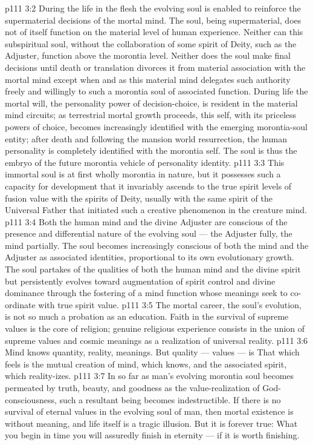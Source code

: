 \vs p111 3:2 During the life in the flesh the evolving soul is enabled to reinforce the supermaterial decisions of the mortal mind. The soul, being supermaterial, does not of itself function on the material level of human experience. Neither can this subspiritual soul, without the collaboration of some spirit of Deity, such as the Adjuster, function above the morontia level. Neither does the soul make final decisions until death or translation divorces it from material association with the mortal mind except when and as this material mind delegates such authority freely and willingly to such a morontia soul of associated function. During life the mortal will, the personality power of decision\hyp{}choice, is resident in the material mind circuits; as terrestrial mortal growth proceeds, this self, with its priceless powers of choice, becomes increasingly identified with the emerging morontia\hyp{}soul entity; after death and following the mansion world resurrection, the human personality is completely identified with the morontia self. The soul is thus the embryo of the future morontia vehicle of personality identity.
\vs p111 3:3 This immortal soul is at first wholly morontia in nature, but it possesses such a capacity for development that it invariably ascends to the true spirit levels of fusion value with the spirits of Deity, usually with the same spirit of the Universal Father that initiated such a creative phenomenon in the creature mind.
\vs p111 3:4 Both the human mind and the divine Adjuster are conscious of the presence and differential nature of the evolving soul --- the Adjuster fully, the mind partially. The soul becomes increasingly conscious of both the mind and the Adjuster as associated identities, proportional to its own evolutionary growth. The soul partakes of the qualities of both the human mind and the divine spirit but persistently evolves toward augmentation of spirit control and divine dominance through the fostering of a mind function whose meanings seek to co\hyp{}ordinate with true spirit value.
\vs p111 3:5 The mortal career, the soul’s evolution, is not so much a probation as an education. Faith in the survival of supreme values is the core of religion; genuine religious experience consists in the union of supreme values and cosmic meanings as a realization of universal reality.
\vs p111 3:6 Mind knows quantity, reality, meanings. But quality --- values --- is  That which feels is the mutual creation of mind, which knows, and the associated spirit, which reality\hyp{}izes.
\vs p111 3:7 In so far as man’s evolving morontia soul becomes permeated by truth, beauty, and goodness as the value\hyp{}realization of God\hyp{}consciousness, such a resultant being becomes indestructible. If there is no survival of eternal values in the evolving soul of man, then mortal existence is without meaning, and life itself is a tragic illusion. But it is forever true: What you begin in time you will assuredly finish in eternity --- if it is worth finishing.
